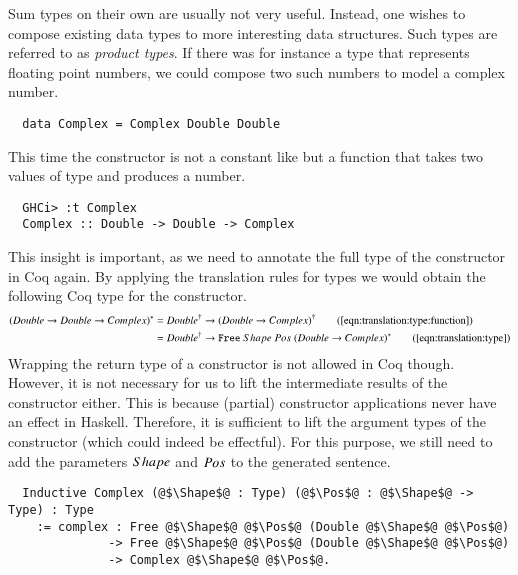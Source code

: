 Sum types on their own are usually not very useful.
Instead, one wishes to compose existing data types to more interesting data structures.
Such types are referred to as \textit{product types}.
If there was for instance a type  that represents floating point numbers, we could compose two such numbers to model a complex number.
\begin{verbatim}
  data Complex = Complex Double Double
\end{verbatim}
This time the constructor  is not a constant like  but a function that takes two values of type  and produces a  number.
\begin{verbatim}
  GHCi> :t Complex
  Complex :: Double -> Double -> Complex
\end{verbatim}
This insight is important, as we need to annotate the full type of the constructor in Coq again.
By applying the translation rules for types we would obtain the following Coq type for the constructor.
\begin{align*}
  \toCoqT{(Double \rightarrow Double \rightarrow Complex)}
    &= \toCoq{Double} \rightarrow \toCoq{(Double \rightarrow Complex)}
    \tag{\autoref{eqn:translation:type:function}}
    \\
    &= \toCoq{Double} \rightarrow \Free{\toCoqT{(Double \rightarrow Complex)}}
    \tag{\autoref{eqn:translation:type}}
\end{align*}
Wrapping the return type of a constructor is not allowed in Coq though.
However, it is not necessary for us to lift the intermediate results of the constructor either.
This is because (partial) constructor applications never have an effect in Haskell.
Therefore, it is sufficient to lift the argument types of the constructor (which could indeed be effectful).
For this purpose, we still need to add the parameters $Shape$ and $Pos$ to the generated sentence.
\begin{verbatim}
  Inductive Complex (@$\Shape$@ : Type) (@$\Pos$@ : @$\Shape$@ -> Type) : Type
    := complex : Free @$\Shape$@ @$\Pos$@ (Double @$\Shape$@ @$\Pos$@)
              -> Free @$\Shape$@ @$\Pos$@ (Double @$\Shape$@ @$\Pos$@)
              -> Complex @$\Shape$@ @$\Pos$@.
\end{verbatim}

